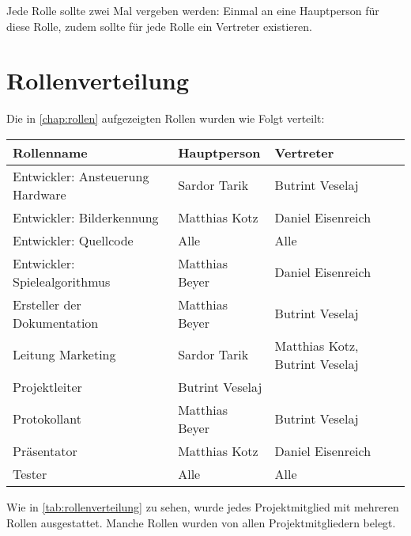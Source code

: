         Jede Rolle sollte zwei Mal vergeben werden: Einmal an eine Hauptperson
        für diese Rolle, zudem sollte für jede Rolle ein Vertreter existieren.

    \section{Rollenverteilung}

        Die in \autoref{chap:rollen} aufgezeigten Rollen wurden wie Folgt
        verteilt:

        \begin{center}
            \begin{tabular}{l | l | l }
                Rollenname                       & Hauptperson     & Vertreter \\

                \hline

                Entwickler: Ansteuerung Hardware & Sardor Tarik    & Butrint Veselaj \\
                Entwickler: Bilderkennung        & Matthias Kotz   & Daniel Eisenreich \\
                Entwickler: Quellcode            & Alle            & Alle \\
                Entwickler: Spielealgorithmus    & Matthias Beyer  & Daniel Eisenreich \\
                Ersteller der Dokumentation      & Matthias Beyer  & Butrint Veselaj \\
                Leitung Marketing                & Sardor Tarik    & Matthias Kotz, Butrint Veselaj \\
                Projektleiter                    & Butrint Veselaj & \\
                Protokollant                     & Matthias Beyer  & Butrint Veselaj \\
                Präsentator                      & Matthias Kotz   & Daniel Eisenreich \\
                Tester                           & Alle            & Alle \\
            \end{tabular}
            \label{tab:rollenverteilung}
        \end{center}

        Wie in \autoref{tab:rollenverteilung} zu sehen, wurde jedes
        Projektmitglied mit mehreren Rollen ausgestattet.
        Manche Rollen wurden von allen Projektmitgliedern belegt.

